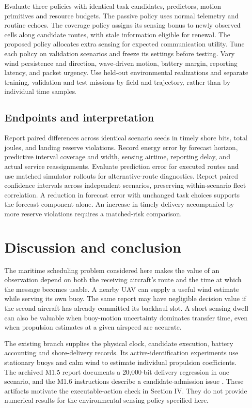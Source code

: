 \documentclass[journal]{IEEEtran}
\begin{document}
Evaluate three policies with identical task candidates, predictors, motion primitives and resource budgets. The passive policy uses normal telemetry and routine echoes. The coverage policy assigns its sensing bonus to newly observed cells along candidate routes, with stale information eligible for renewal. The proposed policy allocates extra sensing for expected communication utility. Tune each policy on validation scenarios and freeze its settings before testing. Vary wind persistence and direction, wave-driven motion, battery margin, reporting latency, and packet urgency. Use held-out environmental realizations and separate training, validation and test missions by field and trajectory, rather than by individual time samples.

\subsection{Endpoints and interpretation}
Report paired differences across identical scenario seeds in timely shore bits, total joules, and landing reserve violations. Record energy error by forecast horizon, predictive interval coverage and width, sensing airtime, reporting delay, and actual service reassignments. Evaluate prediction error for executed routes and use matched simulator rollouts for alternative-route diagnostics. Report paired confidence intervals across independent scenarios, preserving within-scenario fleet correlation. A reduction in forecast error with unchanged task choices supports the forecast component alone. An increase in timely delivery accompanied by more reserve violations requires a matched-risk comparison.

\section{Discussion and conclusion}
The maritime scheduling problem considered here makes the value of an observation depend on both the receiving aircraft's route and the time at which the message becomes usable. A nearby UAV can supply a useful wind estimate while serving its own buoy. The same report may have negligible decision value if the second aircraft has already committed its backhaul slot. A short sensing dwell can also be valuable when buoy-motion uncertainty dominates transfer time, even when propulsion estimates at a given airspeed are accurate.

The existing branch supplies the physical clock, candidate execution, battery accounting and shore-delivery records. Its active-identification experiments use stationary buoys and calm wind to estimate individual propulsion coefficients. The archived M1.5 report documents a 20,000-bit delivery regression in one scenario, and the M1.6 instructions describe a candidate-admission issue \cite{r7}. These artifacts motivate the executable-action check in Section IV. They do not provide numerical results for the environmental sensing policy specified here.
\end{document}
